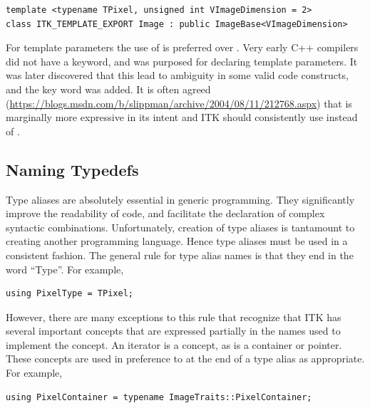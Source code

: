 \small
\begin{verbatim}
template <typename TPixel, unsigned int VImageDimension = 2>
class ITK_TEMPLATE_EXPORT Image : public ImageBase<VImageDimension>
\end{verbatim}
\normalsize

For template parameters the use of  is preferred over
. Very early C++ compilers did not have a  keyword,
and  was purposed for declaring template parameters. It was later
discovered that this lead to ambiguity in some valid code constructs, and the
 key word was added. It is often agreed
(\href{https://blogs.msdn.com/b/slippman/archive/2004/08/11/212768.aspx}
{https://blogs.msdn.com/b/slippman/archive/2004/08/11/212768.aspx}) that
 is marginally more expressive in its intent and ITK should
consistently use  instead of .


\subsection{Naming Typedefs}%
\label{subsec:NamingTypedefs}

Type aliases are absolutely essential in generic programming. They significantly
improve the readability of code, and facilitate the declaration of complex
syntactic combinations. Unfortunately, creation of type aliases is tantamount to
creating another programming language. Hence type aliases must be used in a
consistent fashion. The general rule for type alias names is that they end in the
word ``Type''. For example,

\small
\begin{verbatim}
using PixelType = TPixel;
\end{verbatim}
\normalsize

However, there are many exceptions to this rule that recognize that ITK has
several important concepts that are expressed partially in the names used to
implement the concept. An iterator is a concept, as is a container or pointer.
These concepts are used in preference to  at the end of a type alias as
appropriate. For example,

\small
\begin{verbatim}
using PixelContainer = typename ImageTraits::PixelContainer;
\end{verbatim}
\normalsize

